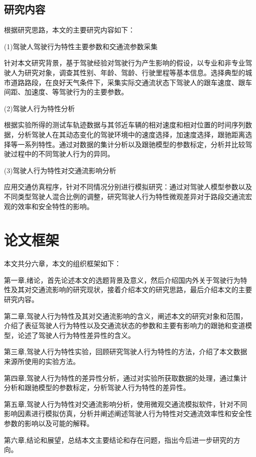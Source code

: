 \subsection{研究内容}
根据研究思路，本文的主要研究内容如下：

(1)驾驶人驾驶行为特性主要参数和交通流参数采集

针对本文研究背景，基于驾驶经验对驾驶行为产生影响的假设，以专业和非专业驾驶人为研究对象，调查其性别、年龄、驾龄、行驶里程等基本信息。选择典型的城市道路路段，在良好天气条件下，采集实际交通流状态下驾驶人的跟车速度、跟车间距、加速度、等驾驶行为的主要参数。

(2)驾驶人行为特性分析

根据实验所得的测试车轨迹数据与其邻近车辆的相对速度和相对位置的时间序列数据，分析驾驶人在其动态变化的驾驶环境中的速度选择，加速度选择，跟驰距离选择等一系列特性。通过对数据的集计分析以及跟驰模型的参数标定，分析并比较驾驶过程中的不同驾驶人行为的异同。

(3)驾驶人行为特性对交通流影响分析

应用交通仿真程序，针对不同情况分别进行模拟研究：通过对驾驶人模型参数以及不同类型驾驶人混合比例的调整，研究驾驶人行为特性微观差异对于路段交通流宏观的效率和安全特性的影响。


\section{论文框架}
本文共分六章，本文的组织框架如下：

第一章,绪论，首先论述本文的选题背景及意义，然后介绍国内外关于驾驶行为特性及其对交通流影响的研究现状，接着介绍本文的研究思路，最后介绍本文的主要研究内容。

第二章,驾驶人行为特性及其对交通流影响的含义，阐述本文的研究对象和范围，介绍了表征驾驶人行为特性以及交通流状态的参数和主要有影响力的跟驰和变道模型，论述了驾驶人行为特性差异性的含义。

第三章,驾驶人行为特性实验，回顾研究驾驶人行为特性的方法，介绍了本文数据来源所使用的实验方法。

第四章,驾驶人行为特性的差异性分析，通过对实验所获取数据的处理，通过集计分析和跟驰模型的参数标定，分析驾驶人行为特性的差异性。

第五章,驾驶人行为特性对交通流影响分析，使用微观交通流模拟软件，针对不同影响因素进行模拟仿真，分析并阐述阐述驾驶人行为特性对交通流效率性和安全性参数的影响以及可能的解释。

第六章,结论和展望，总结本文主要结论和存在问题，指出今后进一步研究的方向。
